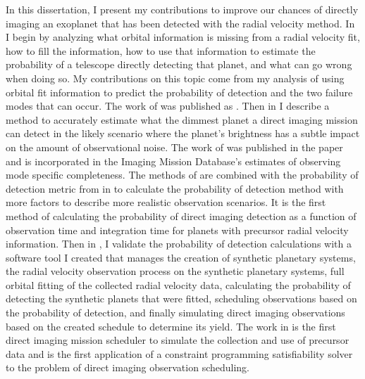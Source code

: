 In this dissertation, I present my contributions to improve our chances of
directly imaging an exoplanet that has been detected with the radial velocity
method. In  I begin by analyzing what orbital information
is missing from a radial velocity fit, how to fill the information, how to use
that information to estimate the probability of a telescope directly detecting
that planet, and what can go wrong when doing so. My contributions on this
topic come from my analysis of using orbital fit information to predict the
probability of detection and the two failure modes that can occur. The work of
 was published as \citet{spohnSchedulingDirect2022}. Then
in  I describe a method to accurately estimate what the
dimmest planet a direct imaging mission can detect in the likely scenario where
the planet's brightness has a subtle impact on the amount of observational
noise. The work of  was published in the paper
\citet{spohnDirectImaging2022} and is incorporated in the Imaging Mission
Database's \citep{savranskyExplorationDynamical2019} estimates of observing
mode specific completeness. The methods of  are combined
with the probability of detection metric from  in
 to calculate the probability of detection method with
more factors to describe more realistic observation scenarios. It is the first
method of calculating the probability of direct imaging detection as a function
of observation time and integration time for planets with precursor radial
velocity information. Then in , I validate the
probability of detection calculations with a software tool I created that
manages the creation of synthetic planetary systems, the radial velocity
observation process on the synthetic planetary systems, full orbital fitting of
the collected radial velocity data, calculating the probability of detecting
the synthetic planets that were fitted, scheduling observations based on the
probability of detection, and finally simulating direct imaging observations
based on the created schedule to determine its yield. The work in
 is the first direct imaging mission scheduler to
simulate the collection and use of precursor data and is the first application
of a constraint programming satisfiability solver to the problem of direct
imaging observation scheduling.

